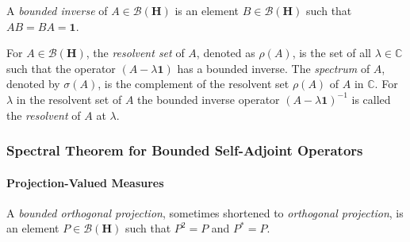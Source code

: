 \begin{definition}
    \label{def:bounded-inverse}
    A \textit{bounded inverse} of $A \in \mathcal{B}(\mathbf{H})$ is an element $B \in \mathcal{B}(\mathbf{H})$ such that $AB = BA = \mathbf{1}$.
\end{definition}

\begin{definition}
    \label{def:bounded-operator-resolvent-and-spectrum} %
    For $A \in \mathcal{B}(\mathbf{H})$, the \textit{resolvent set} of $A$, denoted as $\rho(A)$, is the set of all $\lambda \in \mathbb{C}$ such that the operator $(A - \lambda \mathbf{1})$ has a bounded inverse. The \textit{spectrum} of $A$, denoted by $\sigma(A)$, is the complement of the resolvent set $\rho(A)$ of $A$ in $\mathbb{C}$. For $\lambda$ in the resolvent set of $A$ the bounded inverse operator $(A - \lambda \mathbf{1})^{-1}$ is called the \textit{resolvent} of $A$ at $\lambda$.
\end{definition}

\subsubsection{Spectral Theorem for Bounded Self-Adjoint Operators}

\paragraph{Projection-Valued Measures}

\begin{definition}
    \label{def:bounded-orthogonal-projection}
    A \textit{bounded orthogonal projection}, sometimes shortened to \textit{orthogonal projection}, is an element $P \in \mathcal{B}(\mathbf{H})$ such that $P^2 = P$ and $P^* = P$.
\end{definition}

